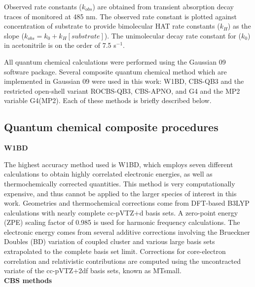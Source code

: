 Observed rate constants ($k_{obs}$) are obtained from transient absorption decay traces of \cumo monitored at 485 nm. The observed rate constant is plotted against concentration of substrate to provide bimolecular HAT rate constants ($k_H$) as the slope ($k_{obs} = k_0 + k_H[substrate]$). The unimolecular decay rate constant for \cumo ($k_0$) in acetonitrile is on the order of 7.5  s$^{-1}$.\cite{Avila1995}

All quantum chemical calculations were performed using the Gaussian 09 software package.\cite{Frisch2009} Several composite quantum chemical method which are implemented in Gaussian 09 were used in this work: W1BD, CBS-QB3 and the restricted open-shell variant ROCBS-QB3, CBS-APNO, and G4 and the MP2 variable G4(MP2). Each of these methods is briefly described below.


\subsection{Quantum chemical composite procedures}

\noindent \textbf{W1BD}

The highest accuracy method used is W1BD, which employs seven different calculations to obtain highly correlated electronic energies, as well as thermochemically corrected quantities. This method is very computationally expensive, and thus cannot be applied to the larger species of interest in this work. Geometries and thermochemical corrections come from DFT-based B3LYP calculations with nearly complete cc-pVTZ+d basis sets. A zero-point energy (ZPE) scaling factor of 0.985 is used for harmonic frequency calculations. The electronic energy comes from several additive corrections involving the Brueckner Doubles\cite{Barnes2009} (BD) variation of coupled cluster and various large basis sets extrapolated to the complete basis set limit. Corrections for core-electron correlation and relativistic contributions are computed using the uncontracted variate of the cc-pVTZ+2df basis sets, known as MTsmall.\cite{Martin1999}
\\

\noindent \textbf{CBS methods}

